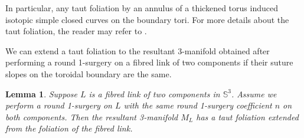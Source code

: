\documentclass{amsart}
\theoremstyle{plain}
\newtheorem{lem}{Lemma}
\theoremstyle{remark}
\theoremstyle{definition}
\begin{document}
In particular, any taut foliation by an annulus of a thickened torus induced isotopic simple closed curves on the boundary tori. 
For more details about the taut foliation, the reader may refer to \cite{FolBook}.

We can extend a taut foliation to the resultant 3-manifold obtained after performing a round 1-surgery on a fibred link of two components if their suture slopes on the toroidal boundary are the same. 

\begin{lem}
\label{lem: Application1}
   Suppose $L$ is a fibred link of two components in $\mathbb{S}^3$. 
   Assume we perform a round 1-surgery on $L$ with the same round 1-surgery coefficient $n$ on both components. 
   Then the resultant 3-manifold $M_L$ has a taut foliation extended from the foliation of the fibred link. 
\end{lem}
\end{document}
